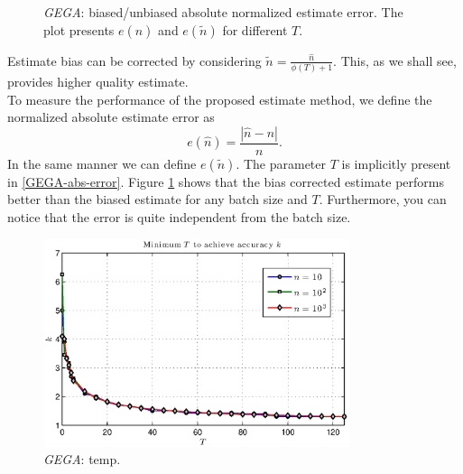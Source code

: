 \documentclass[11pt,a4paper,twoside,openright]{book}
\begin{document}
\begin{figure}[thbp]
 \caption[\emph{GEGA}: Biased/unbiased absolute normalized estimate error]{\emph{GEGA}: biased/unbiased absolute normalized estimate error. The plot presents $e(\hat{n})$ and $e(\tilde{n})$ for different $T$.}
 \label{fg:GEGA-biased-unbiased}
\end{figure}

Estimate bias can be corrected by considering $\tilde{n}={\displaystyle \frac{\hat{n}}{\phi(T)+1}}$. This, as we shall see, provides higher quality estimate.\\
To measure the performance of the proposed estimate method, we define the normalized absolute estimate error as
\begin{equation}
e(\hat{n})=\frac{|\hat{n}-n|}{n}.
\label{GEGA-abs-error}
\end{equation}
In the same manner we can define $e(\tilde{n})$. The parameter $T$ is implicitly present in \eqref{GEGA-abs-error}.
Figure \ref{fg:GEGA-biased-unbiased} shows that the bias corrected estimate performs better than the biased estimate for any batch size and $T$. Furthermore, you can notice that the error is quite independent from  the batch size.  
\begin{figure}[thbp]
\centering
    \includegraphics[width=0.8\textwidth,height=0.3\textheight]{matlab/GEGA/GEGA-min-T-for-k}%
 \caption{\emph{GEGA}: temp.}
 \label{fg:GEGA-min-T-for-k}
\end{figure}
\end{document}
